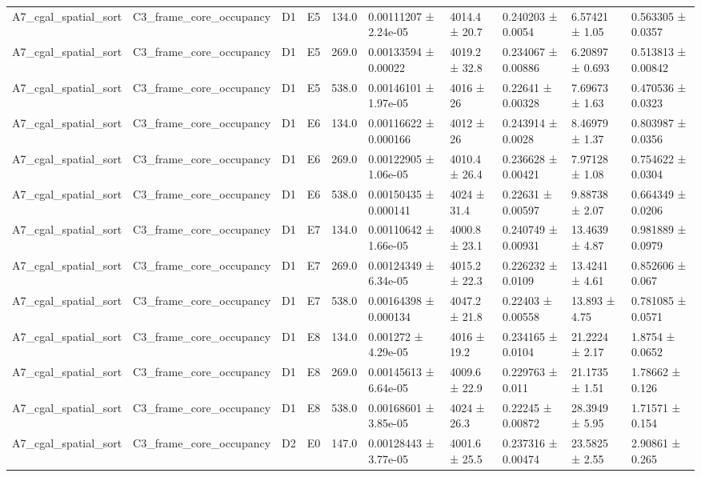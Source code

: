 \begin{table}
\begin{tabular}{llllllllll}
A7\_cgal\_spatial\_sort & C3\_frame\_core\_occupancy & D1 & E5 & 134.0 & 0.00111207 ± 2.24e-05 & 4014.4 ± 20.7 & 0.240203 ± 0.0054 & 6.57421 ± 1.05 & 0.563305 ± 0.0357 \\
A7\_cgal\_spatial\_sort & C3\_frame\_core\_occupancy & D1 & E5 & 269.0 & 0.00133594 ± 0.00022 & 4019.2 ± 32.8 & 0.234067 ± 0.00886 & 6.20897 ± 0.693 & 0.513813 ± 0.00842 \\
A7\_cgal\_spatial\_sort & C3\_frame\_core\_occupancy & D1 & E5 & 538.0 & 0.00146101 ± 1.97e-05 & 4016 ± 26 & 0.22641 ± 0.00328 & 7.69673 ± 1.63 & 0.470536 ± 0.0323 \\
A7\_cgal\_spatial\_sort & C3\_frame\_core\_occupancy & D1 & E6 & 134.0 & 0.00116622 ± 0.000166 & 4012 ± 26 & 0.243914 ± 0.0028 & 8.46979 ± 1.37 & 0.803987 ± 0.0356 \\
A7\_cgal\_spatial\_sort & C3\_frame\_core\_occupancy & D1 & E6 & 269.0 & 0.00122905 ± 1.06e-05 & 4010.4 ± 26.4 & 0.236628 ± 0.00421 & 7.97128 ± 1.08 & 0.754622 ± 0.0304 \\
A7\_cgal\_spatial\_sort & C3\_frame\_core\_occupancy & D1 & E6 & 538.0 & 0.00150435 ± 0.000141 & 4024 ± 31.4 & 0.22631 ± 0.00597 & 9.88738 ± 2.07 & 0.664349 ± 0.0206 \\
A7\_cgal\_spatial\_sort & C3\_frame\_core\_occupancy & D1 & E7 & 134.0 & 0.00110642 ± 1.66e-05 & 4000.8 ± 23.1 & 0.240749 ± 0.00931 & 13.4639 ± 4.87 & 0.981889 ± 0.0979 \\
A7\_cgal\_spatial\_sort & C3\_frame\_core\_occupancy & D1 & E7 & 269.0 & 0.00124349 ± 6.34e-05 & 4015.2 ± 22.3 & 0.226232 ± 0.0109 & 13.4241 ± 4.61 & 0.852606 ± 0.067 \\
A7\_cgal\_spatial\_sort & C3\_frame\_core\_occupancy & D1 & E7 & 538.0 & 0.00164398 ± 0.000134 & 4047.2 ± 21.8 & 0.22403 ± 0.00558 & 13.893 ± 4.75 & 0.781085 ± 0.0571 \\
A7\_cgal\_spatial\_sort & C3\_frame\_core\_occupancy & D1 & E8 & 134.0 & 0.001272 ± 4.29e-05 & 4016 ± 19.2 & 0.234165 ± 0.0104 & 21.2224 ± 2.17 & 1.8754 ± 0.0652 \\
A7\_cgal\_spatial\_sort & C3\_frame\_core\_occupancy & D1 & E8 & 269.0 & 0.00145613 ± 6.64e-05 & 4009.6 ± 22.9 & 0.229763 ± 0.011 & 21.1735 ± 1.51 & 1.78662 ± 0.126 \\
A7\_cgal\_spatial\_sort & C3\_frame\_core\_occupancy & D1 & E8 & 538.0 & 0.00168601 ± 3.85e-05 & 4024 ± 26.3 & 0.22245 ± 0.00872 & 28.3949 ± 5.95 & 1.71571 ± 0.154 \\
A7\_cgal\_spatial\_sort & C3\_frame\_core\_occupancy & D2 & E0 & 147.0 & 0.00128443 ± 3.77e-05 & 4001.6 ± 25.5 & 0.237316 ± 0.00474 & 23.5825 ± 2.55 & 2.90861 ± 0.265 \\

\end{tabular}
\end{table}
